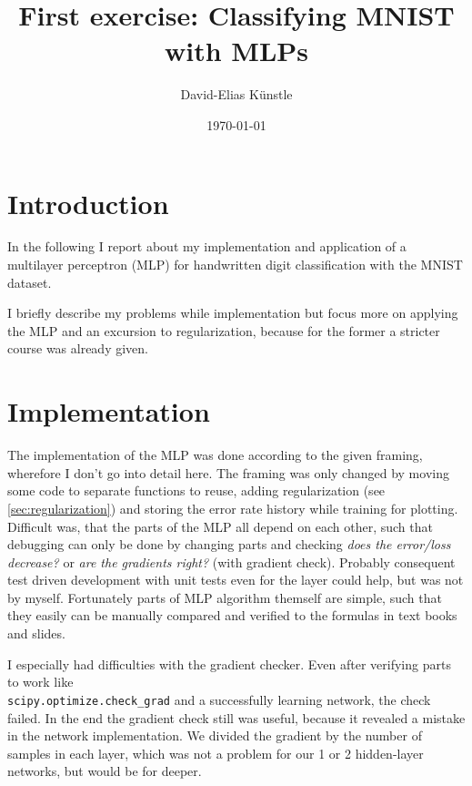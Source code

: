 \documentclass[a4paper,11pt]{article}
\begin{document}
\title{First exercise: Classifying MNIST with MLPs}
\author{David-Elias K\"unstle}
\date{\today}
\maketitle
\section{Introduction}

In the following I report about my implementation and application of a multilayer perceptron
(MLP) for handwritten digit classification with the MNIST dataset.

I briefly describe my problems while implementation but focus more on
applying the MLP and an excursion to regularization, because for the former a
stricter course was already given.

\section{Implementation}

The implementation of the MLP was done according to the given framing, wherefore
I don't go into detail here.
The framing was only changed by moving some code to separate functions to
reuse, adding regularization (see \autoref{sec:regularization}) and
storing the error rate history while training for plotting.
Difficult was, that the parts of the MLP all depend on each other, such that
debugging can only be done by changing parts and checking \emph{does the
  error/loss decrease?} or \emph{are the gradients right?} (with gradient check).
Probably consequent test driven development with unit tests even for the layer
could help, but was not by myself.
Fortunately parts of MLP algorithm themself are simple, such that
they easily can be manually compared and verified to the formulas in text books
and slides.

I especially had difficulties with the gradient checker. Even after
verifying parts to work like \\ \texttt{scipy.optimize.check\_grad}
and a successfully learning network, the check failed.
In the end the gradient check still was useful, because it revealed
a mistake in the network implementation.
We divided the gradient by the number of samples in each layer,
which was not a problem for our 1 or 2 hidden-layer networks, but
would be for deeper.
\end{document}
